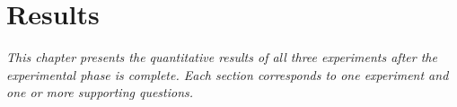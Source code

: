 \chapter{Results}

\textit{This chapter presents the quantitative results of all three experiments after the
experimental phase is complete. Each section corresponds to one experiment and one or more
supporting questions.}




